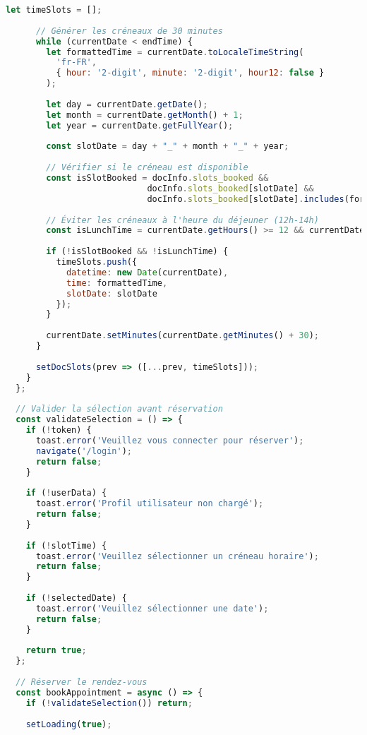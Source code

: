 \begin{lstlisting}[language=JavaScript, caption=AppointmentForm.jsx - Formulaire de réservation avec validation]
      let timeSlots = [];
      
      // Générer les créneaux de 30 minutes
      while (currentDate < endTime) {
        let formattedTime = currentDate.toLocaleTimeString(
          'fr-FR', 
          { hour: '2-digit', minute: '2-digit', hour12: false }
        );
        
        let day = currentDate.getDate();
        let month = currentDate.getMonth() + 1;
        let year = currentDate.getFullYear();
        
        const slotDate = day + "_" + month + "_" + year;
        
        // Vérifier si le créneau est disponible
        const isSlotBooked = docInfo.slots_booked && 
                            docInfo.slots_booked[slotDate] && 
                            docInfo.slots_booked[slotDate].includes(formattedTime);
        
        // Éviter les créneaux à l'heure du déjeuner (12h-14h)
        const isLunchTime = currentDate.getHours() >= 12 && currentDate.getHours() < 14;
        
        if (!isSlotBooked && !isLunchTime) {
          timeSlots.push({
            datetime: new Date(currentDate),
            time: formattedTime,
            slotDate: slotDate
          });
        }
        
        currentDate.setMinutes(currentDate.getMinutes() + 30);
      }
      
      setDocSlots(prev => ([...prev, timeSlots]));
    }
  };
  
  // Valider la sélection avant réservation
  const validateSelection = () => {
    if (!token) {
      toast.error('Veuillez vous connecter pour réserver');
      navigate('/login');
      return false;
    }
    
    if (!userData) {
      toast.error('Profil utilisateur non chargé');
      return false;
    }
    
    if (!slotTime) {
      toast.error('Veuillez sélectionner un créneau horaire');
      return false;
    }
    
    if (!selectedDate) {
      toast.error('Veuillez sélectionner une date');
      return false;
    }
    
    return true;
  };
  
  // Réserver le rendez-vous
  const bookAppointment = async () => {
    if (!validateSelection()) return;
    
    setLoading(true);
    

\end{lstlisting}
